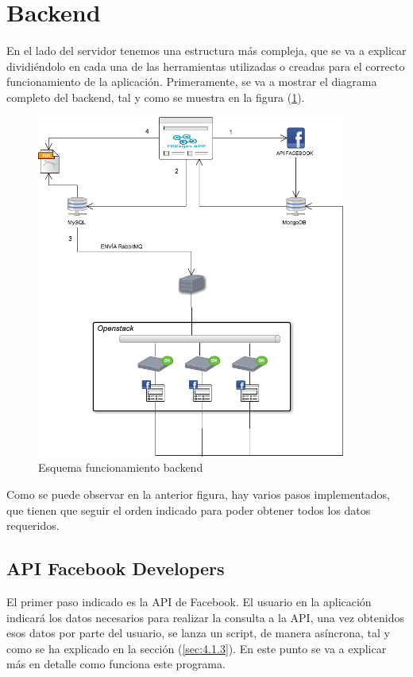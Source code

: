 \section{Backend}
En el lado del servidor tenemos una estructura más compleja, que se va a explicar dividiéndolo en cada una de las herramientas utilizadas o creadas para el correcto funcionamiento de la aplicación.
Primeramente, se va a mostrar el diagrama completo del backend, tal y como se muestra en la figura (\ref{fig:backend}). 
\begin{figure}[H]
\centering
\includegraphics[width=4in]{figuras/backend.png}
\caption{Esquema funcionamiento backend} \label{fig:backend}
\end{figure}

Como se puede observar en la anterior figura, hay varios pasos implementados, que tienen que seguir el orden indicado para poder obtener todos los datos requeridos.

\subsection{API Facebook Developers} \label{sec:4.2.2}
El primer paso indicado es la API de Facebook. El usuario en la aplicación indicará los datos necesarios para realizar la consulta a la API, una vez obtenidos esos datos por parte del usuario, se lanza un script, de manera asíncrona, tal y como se ha explicado en la sección (\ref{sec:4.1.3}). En este punto se va a explicar más en detalle como funciona este programa.


